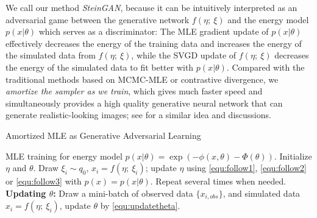 \documentclass{article} %
\begin{document}
We call our method \emph{SteinGAN}, because it can be intuitively
interpreted as an adversarial game between 
the generative network $f(\eta;~\xi)$ and 
the energy model $p(x|\theta)$ which serves as a discriminator:
The MLE gradient update of $p(x|\theta)$ effectively decreases the energy of the training data and increases the energy of the simulated data from $f(\eta;~\xi)$, while the SVGD update of $f(\eta;~\xi)$ decreases the energy of the simulated data to fit better with $p(x|\theta)$.  
Compared with the traditional methods based on MCMC-MLE or contrastive divergence, we \emph{amortize the sampler as we train}, which gives much faster speed and simultaneously provides a high quality generative neural network that can generate realistic-looking images; see \citet{kim2016deep} for a similar idea and discussions. 

\begin{algorithm}[t]                      %
\caption{Amortized MLE as Generative Adversarial Learning}%
\label{alg:gan}                           %
\begin{algorithmic}                    %
 MLE training for energy model $p(x|\theta) = \exp(-\phi(x,\theta) - \Phi(\theta))$.
\STATE Initialize $\eta$ and $\theta$. 
 Draw $\xi_i\sim q_0$, $x_i = f(\eta;~\xi_i)$; update $\eta$ using \eqref{equ:follow1}, \eqref{equ:follow2} or \eqref{equ:follow3} with $p(x)=p(x|\theta)$. Repeat several times when needed. 
\STATE 
 {\bf Updating $\theta$:}  Draw a mini-batch of observed data $\{x_{i,obs}\}$, and simulated data $x_i = f(\eta;~\xi_i)$, update $\theta$ by \eqref{equ:updatetheta}. 
\ENDFOR
\end{algorithmic}
\end{algorithm}
\end{document}
